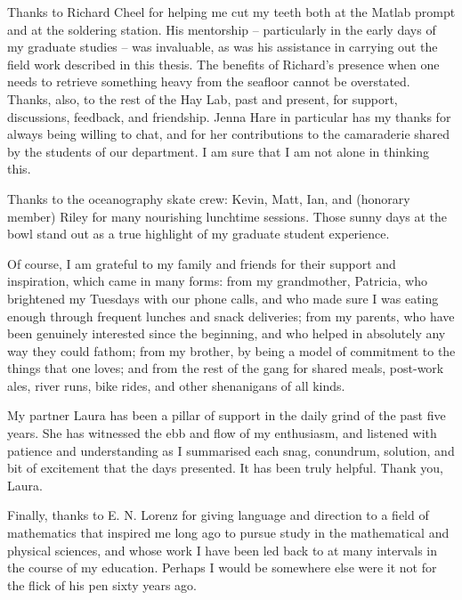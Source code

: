\begin{acknowledgements}
Thanks to Richard Cheel for helping me cut my teeth both at the Matlab prompt and at the soldering station. His mentorship -- particularly in the early days of my graduate studies -- was invaluable, as was his assistance in carrying out the field work described in this thesis. The benefits of Richard's presence when one needs to retrieve something heavy from the seafloor cannot be overstated. Thanks, also, to the rest of the Hay Lab, past and present, for support, discussions, feedback, and friendship. Jenna Hare in particular has my thanks for always being willing to chat, and for her contributions to the camaraderie shared by the students of our department. I am sure that I am not alone in thinking this.
	
Thanks to the oceanography skate crew: Kevin, Matt, Ian, and (honorary member) Riley for many nourishing lunchtime sessions. Those sunny days at the bowl stand out as a true highlight of my graduate student experience.

Of course, I am grateful to my family and friends for their support and inspiration, which came in many forms: from my grandmother, Patricia, who brightened my Tuesdays with our phone calls, and who made sure I was eating enough through frequent lunches and snack deliveries; from my parents, who have been genuinely interested since the beginning, and who helped in absolutely any way they could fathom; from my brother, by being a model of commitment to the things that one loves; and from the rest of the gang for shared meals, post-work ales, river runs, bike rides, and other shenanigans of all kinds. 

My partner Laura has been a pillar of support in the daily grind of the past five years. She has witnessed the ebb and flow of my enthusiasm, and listened with patience and understanding as I summarised each snag, conundrum, solution, and bit of excitement that the days presented. It has been truly helpful. Thank you, Laura.

Finally, thanks to E. N. Lorenz for giving language and direction to a field of mathematics that inspired me long ago to pursue study in the mathematical and physical sciences, and whose work I have been led back to at many intervals in the course of my education. Perhaps I would be somewhere else were it not for the flick of his pen sixty years ago.

\end{acknowledgements}
 
